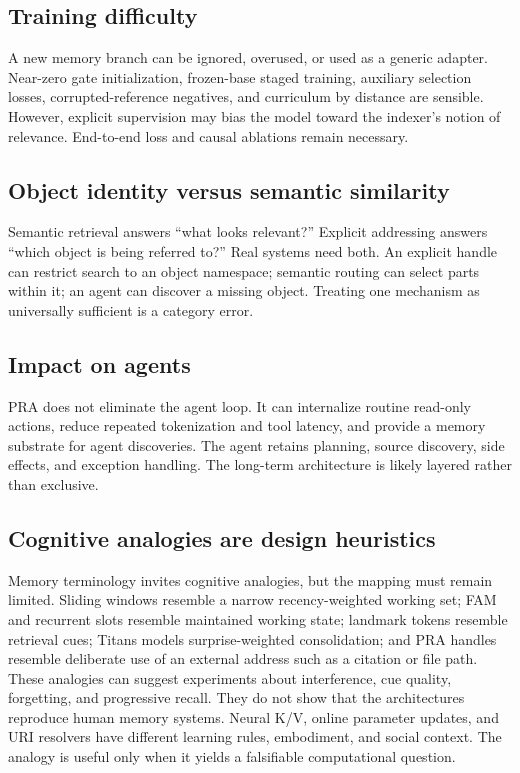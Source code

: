 \documentclass[10pt,a4paper]{article}
\begin{document}
\subsection{Training difficulty}
A new memory branch can be ignored, overused, or used as a generic adapter. Near-zero gate initialization, frozen-base staged training, auxiliary selection losses, corrupted-reference negatives, and curriculum by distance are sensible. However, explicit supervision may bias the model toward the indexer's notion of relevance. End-to-end loss and causal ablations remain necessary.

\subsection{Object identity versus semantic similarity}
Semantic retrieval answers ``what looks relevant?'' Explicit addressing answers ``which object is being referred to?'' Real systems need both. An explicit handle can restrict search to an object namespace; semantic routing can select parts within it; an agent can discover a missing object. Treating one mechanism as universally sufficient is a category error.

\subsection{Impact on agents}
PRA does not eliminate the agent loop. It can internalize routine read-only actions, reduce repeated tokenization and tool latency, and provide a memory substrate for agent discoveries. The agent retains planning, source discovery, side effects, and exception handling. The long-term architecture is likely layered rather than exclusive.

\subsection{Cognitive analogies are design heuristics}
Memory terminology invites cognitive analogies, but the mapping must remain limited.
Sliding windows resemble a narrow recency-weighted working set; FAM and recurrent slots
resemble maintained working state; landmark tokens resemble retrieval cues; Titans models
surprise-weighted consolidation; and PRA handles resemble deliberate use of an external
address such as a citation or file path. These analogies can suggest experiments about
interference, cue quality, forgetting, and progressive recall. They do not show that the
architectures reproduce human memory systems. Neural K/V, online parameter updates, and
URI resolvers have different learning rules, embodiment, and social context. The analogy
is useful only when it yields a falsifiable computational question.
\end{document}
